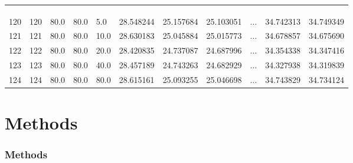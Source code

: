 \documentclass{beamer}
\begin{document}
\begin{frame}
\begin{table}[h]
{\begin{tabular}{ccp{0.8cm}p{0.8cm}p{0.8cm}p{1.6cm}p{1.6cm}p{1.6cm}p{0.3cm}p{1.6cm}p{1.6cm}}
				\bottomrule
				&&&&&&&&&&\\
				&&&&&&&\sbox0{\dots}\makebox[\wd0]{\vdots}&&&\\
				&&&&&&&&&&\\
				\toprule
				
				120 &       120 &  80.0 &  80.0 &   5.0 &      28.548244 &     25.157684 &     25.103051 &$\dots$&         34.742313 &         34.749349 \\
				121 &       121 &  80.0 &  80.0 &  10.0 &    28.630183 &     25.045884 &     25.015773 & $\dots$&        34.678857 &         34.675690 \\
				122 &       122 &  80.0 &  80.0 &  20.0 &  28.420835 &     24.737087 &     24.687996 & $\dots$&        34.354338 &         34.347416 \\
				123 &       123 &  80.0 &  80.0 &  40.0 &  28.457189 &     24.743263 &     24.682929 &$\dots$&         34.327938 &         34.319839 \\
				124 &       124 &  80.0 &  80.0 &  80.0 &    28.615161 &     25.093255 &     25.046698 & $\dots$&        34.743829 &         34.734124 \\
				\bottomrule[0.5mm]
		\end{tabular}}
	\end{table}
\end{frame}




\section{Methods}
\begin{frame}
	\frametitle{Methods}
	
\end{frame}
\end{document}

